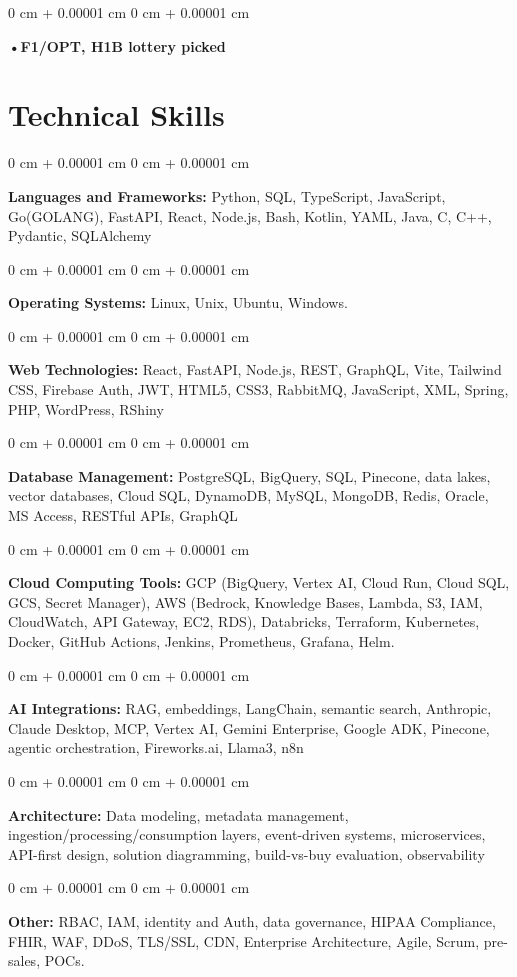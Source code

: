 \documentclass[10pt, letterpaper]{article}
\newenvironment{onecolentry}{
    \begin{adjustwidth}{
        0 cm + 0.00001 cm
    }{
        0 cm + 0.00001 cm
    }
}{
    \end{adjustwidth}
} %
\begin{document}
        \begin{onecolentry}
                \textbf{•F1/OPT, H1B lottery picked}
        \end{onecolentry}

    \vspace{2 pt }

    \section{Technical Skills}
    \vspace{2 pt }
    \begin{onecolentry}
    \textbf{Languages and Frameworks:} Python, SQL, TypeScript, JavaScript, Go(GOLANG), FastAPI, React, Node.js, Bash, Kotlin, YAML, Java, C, C++, Pydantic, SQLAlchemy
    \end{onecolentry}
    \begin{onecolentry}
        \textbf{Operating Systems:} Linux, Unix, Ubuntu, Windows.
    \end{onecolentry}
    \begin{onecolentry}
         \textbf{Web Technologies:} React, FastAPI, Node.js, REST, GraphQL, Vite, Tailwind CSS, Firebase Auth, JWT, HTML5, CSS3, RabbitMQ, JavaScript, XML, Spring, PHP, WordPress, RShiny \end{onecolentry}
    \begin{onecolentry}
        \textbf{Database Management:} PostgreSQL, BigQuery, SQL, Pinecone, data lakes, vector databases, Cloud SQL, DynamoDB, MySQL, MongoDB, Redis, Oracle, MS Access, RESTful APIs, GraphQL \end{onecolentry}
    \begin{onecolentry}
        \textbf{Cloud Computing Tools:}
GCP (BigQuery, Vertex AI, Cloud Run, Cloud SQL, GCS, Secret Manager), AWS (Bedrock, Knowledge Bases, Lambda, S3, IAM, CloudWatch, API Gateway, EC2, RDS), Databricks, Terraform, Kubernetes, Docker, GitHub Actions, Jenkins, Prometheus, Grafana, Helm.
    \end{onecolentry}
    \begin{onecolentry}
         \textbf{AI Integrations:} RAG, embeddings, LangChain, semantic search, Anthropic, Claude Desktop, MCP, Vertex AI, Gemini Enterprise, Google ADK, Pinecone, agentic orchestration, Fireworks.ai, Llama3, n8n \end{onecolentry}
    \begin{onecolentry}
        \textbf{Architecture:} Data modeling, metadata management, ingestion/processing/consumption layers, event-driven systems, microservices, API-first design, solution diagramming, build-vs-buy evaluation, observability \end{onecolentry}
        \begin{onecolentry}
     \textbf{Other:} RBAC, IAM, identity and Auth, data governance, HIPAA Compliance, FHIR, WAF, DDoS, TLS/SSL, CDN, Enterprise Architecture, Agile, Scrum, pre-sales, POCs.
    \end{onecolentry}
\end{document}
